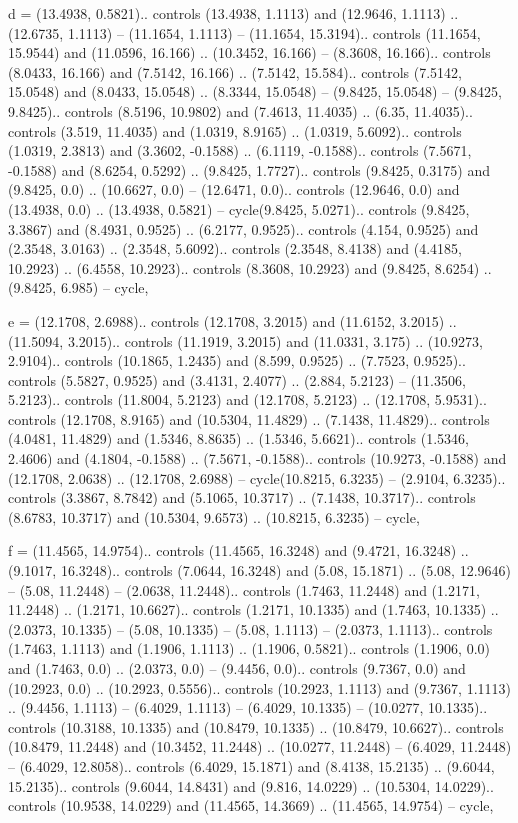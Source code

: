 d = {(13.4938, 0.5821).. controls (13.4938, 1.1113) and (12.9646, 1.1113) .. (12.6735, 1.1113) -- (11.1654, 1.1113) -- (11.1654, 15.3194).. controls (11.1654, 15.9544) and (11.0596, 16.166) .. (10.3452, 16.166) -- (8.3608, 16.166).. controls (8.0433, 16.166) and (7.5142, 16.166) .. (7.5142, 15.584).. controls (7.5142, 15.0548) and (8.0433, 15.0548) .. (8.3344, 15.0548) -- (9.8425, 15.0548) -- (9.8425, 9.8425).. controls (8.5196, 10.9802) and (7.4613, 11.4035) .. (6.35, 11.4035).. controls (3.519, 11.4035) and (1.0319, 8.9165) .. (1.0319, 5.6092).. controls (1.0319, 2.3813) and (3.3602, -0.1588) .. (6.1119, -0.1588).. controls (7.5671, -0.1588) and (8.6254, 0.5292) .. (9.8425, 1.7727).. controls (9.8425, 0.3175) and (9.8425, 0.0) .. (10.6627, 0.0) -- (12.6471, 0.0).. controls (12.9646, 0.0) and (13.4938, 0.0) .. (13.4938, 0.5821) -- cycle(9.8425, 5.0271).. controls (9.8425, 3.3867) and (8.4931, 0.9525) .. (6.2177, 0.9525).. controls (4.154, 0.9525) and (2.3548, 3.0163) .. (2.3548, 5.6092).. controls (2.3548, 8.4138) and (4.4185, 10.2923) .. (6.4558, 10.2923).. controls (8.3608, 10.2923) and (9.8425, 8.6254) .. (9.8425, 6.985) -- cycle},

e = {(12.1708, 2.6988).. controls (12.1708, 3.2015) and (11.6152, 3.2015) .. (11.5094, 3.2015).. controls (11.1919, 3.2015) and (11.0331, 3.175) .. (10.9273, 2.9104).. controls (10.1865, 1.2435) and (8.599, 0.9525) .. (7.7523, 0.9525).. controls (5.5827, 0.9525) and (3.4131, 2.4077) .. (2.884, 5.2123) -- (11.3506, 5.2123).. controls (11.8004, 5.2123) and (12.1708, 5.2123) .. (12.1708, 5.9531).. controls (12.1708, 8.9165) and (10.5304, 11.4829) .. (7.1438, 11.4829).. controls (4.0481, 11.4829) and (1.5346, 8.8635) .. (1.5346, 5.6621).. controls (1.5346, 2.4606) and (4.1804, -0.1588) .. (7.5671, -0.1588).. controls (10.9273, -0.1588) and (12.1708, 2.0638) .. (12.1708, 2.6988) -- cycle(10.8215, 6.3235) -- (2.9104, 6.3235).. controls (3.3867, 8.7842) and (5.1065, 10.3717) .. (7.1438, 10.3717).. controls (8.6783, 10.3717) and (10.5304, 9.6573) .. (10.8215, 6.3235) -- cycle},

f = {(11.4565, 14.9754).. controls (11.4565, 16.3248) and (9.4721, 16.3248) .. (9.1017, 16.3248).. controls (7.0644, 16.3248) and (5.08, 15.1871) .. (5.08, 12.9646) -- (5.08, 11.2448) -- (2.0638, 11.2448).. controls (1.7463, 11.2448) and (1.2171, 11.2448) .. (1.2171, 10.6627).. controls (1.2171, 10.1335) and (1.7463, 10.1335) .. (2.0373, 10.1335) -- (5.08, 10.1335) -- (5.08, 1.1113) -- (2.0373, 1.1113).. controls (1.7463, 1.1113) and (1.1906, 1.1113) .. (1.1906, 0.5821).. controls (1.1906, 0.0) and (1.7463, 0.0) .. (2.0373, 0.0) -- (9.4456, 0.0).. controls (9.7367, 0.0) and (10.2923, 0.0) .. (10.2923, 0.5556).. controls (10.2923, 1.1113) and (9.7367, 1.1113) .. (9.4456, 1.1113) -- (6.4029, 1.1113) -- (6.4029, 10.1335) -- (10.0277, 10.1335).. controls (10.3188, 10.1335) and (10.8479, 10.1335) .. (10.8479, 10.6627).. controls (10.8479, 11.2448) and (10.3452, 11.2448) .. (10.0277, 11.2448) -- (6.4029, 11.2448) -- (6.4029, 12.8058).. controls (6.4029, 15.1871) and (8.4138, 15.2135) .. (9.6044, 15.2135).. controls (9.6044, 14.8431) and (9.816, 14.0229) .. (10.5304, 14.0229).. controls (10.9538, 14.0229) and (11.4565, 14.3669) .. (11.4565, 14.9754) -- cycle},

